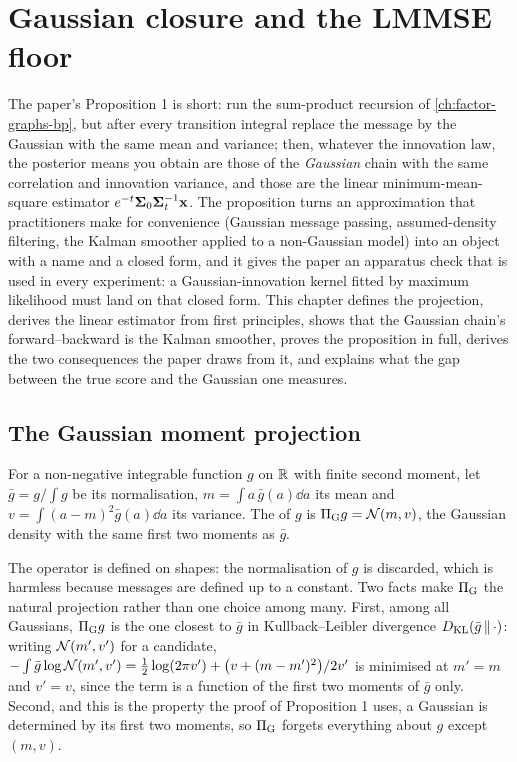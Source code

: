 \chapter{Gaussian closure and the LMMSE floor}
\label{ch:gaussian-closure-lmmse}

The paper's Proposition 1 is short: run the sum-product recursion of
\cref{ch:factor-graphs-bp}, but after every transition integral replace the message by
the Gaussian with the same mean and variance; then, whatever the innovation law, the
posterior means you obtain are those of the \emph{Gaussian} chain with the same
correlation and innovation variance, and those are the linear minimum-mean-square
estimator $e^{-t}\mathbf{\Sigma}_0\mathbf{\Sigma}_t^{-1}\mathbf{x}$. The proposition turns an approximation that
practitioners make for convenience (Gaussian message passing, assumed-density
filtering, the Kalman smoother applied to a non-Gaussian model) into an object with a
name and a closed form, and it gives the paper an apparatus check that is used in
every experiment: a Gaussian-innovation kernel fitted by maximum likelihood must land
on that closed form. This chapter defines the projection, derives the linear
estimator from first principles, shows that the Gaussian chain's forward--backward is
the Kalman smoother, proves the proposition in full, derives the two consequences the
paper draws from it, and explains what the gap between the true score and the
Gaussian one measures.

\section{The Gaussian moment projection}

\begin{definition}
\label{def:gc-proj}
For a non-negative integrable function $g$ on $\mathbb{R}$ with finite second moment,
let $\bar g=g/\!\int g$ be its normalisation, $m=\int a\,\bar g(a)\dd a$ its mean and
$v=\int(a-m)^2\bar g(a)\dd a$ its variance. The  of $g$
is $\Pi_{\mathrm{G}} g=\mathcal{N}\!\left(m,v\right)$, the Gaussian density with the same first two moments as
$\bar g$.
\end{definition}

The operator is defined on shapes: the normalisation of $g$ is discarded, which is
harmless because messages are defined up to a constant. Two facts make $\Pi_{\mathrm{G}}$ the
natural projection rather than one choice among many. First, among all Gaussians,
$\Pi_{\mathrm{G}} g$ is the one closest to $\bar g$ in Kullback--Leibler divergence
$D_{\mathrm{KL}}(\bar g\,\|\,\cdot)$: writing $\mathcal{N}\!\left(m',v'\right)$ for a candidate,
$-\int\bar g\log\mathcal{N}\!\left(m',v'\right)=\tfrac12\log(2\pi v')+\bigl(v+(m-m')^2\bigr)/2v'$ is
minimised at $m'=m$ and $v'=v$, since the term is a function of the first two moments of
$\bar g$ only. Second, and this is the property the proof of Proposition 1 uses, a
Gaussian is determined by its first two moments, so $\Pi_{\mathrm{G}}$ forgets everything about
$g$ except $(m,v)$.

